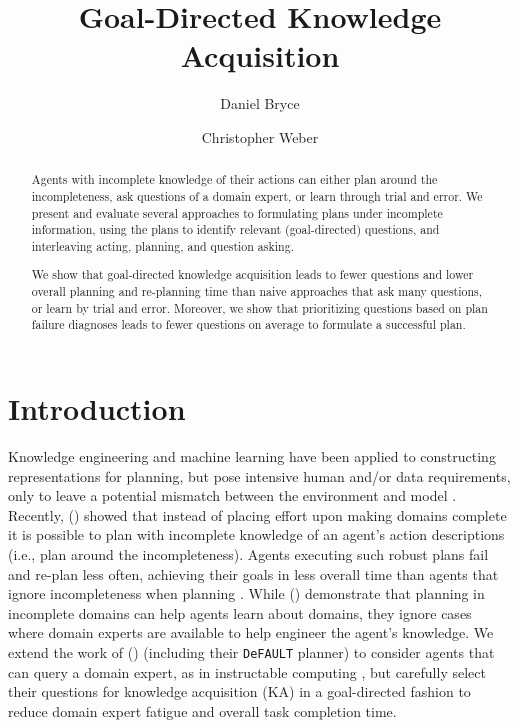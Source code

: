 \documentclass{article}
\title{Goal-Directed Knowledge Acquisition}
\author{Daniel Bryce \and Christopher Weber}
\date{}
\def\citep#1{\cite{#1}}
\def\citet#1{\citeauthor{#1} (\citeyear{#1})}
\def\default{{\tt DeFAULT}}
\begin{document}
\nocopyright
\maketitle

\begin{abstract}
Agents with incomplete knowledge of their actions can either plan around the
incompleteness, ask questions of a domain expert, or learn through trial and
error.  We present and evaluate several approaches to formulating plans under
incomplete information, using the plans to identify relevant (goal-directed)
questions, and interleaving acting, planning, and question asking.  

We show that goal-directed knowledge acquisition leads to fewer questions and
lower overall planning and re-planning time than naive approaches that ask many
questions, or learn by trial and error.  Moreover, we show that prioritizing
questions based on plan failure diagnoses leads to fewer questions on average to
formulate a successful plan.
\end{abstract}

\section{Introduction}

Knowledge engineering \citep{ickeps09} and machine learning
\citep{arms,DBLP:conf/aaai/OatesC96} have been applied to constructing
representations for planning, but pose intensive human and/or data requirements,
only to leave a potential mismatch between the environment and model
\citep{modellite}.  Recently, \citet{bryce-icaps11} showed that instead of
placing effort upon making domains complete it is possible to plan with
incomplete knowledge of an agent's action descriptions (i.e., plan around the
incompleteness).  Agents executing such robust plans fail and re-plan less often,
achieving their goals in less overall time than agents that ignore
incompleteness when planning \citep{DBLP:conf/aips/ChangA06}.  While
\citet{bryce-icaps11} demonstrate that planning in incomplete domains can
help agents learn about domains, they ignore cases where domain experts are
available to help engineer the agent's knowledge.  We extend the work of
\citet{bryce-icaps11} (including their \default{} planner) to consider agents
that can query a domain expert, as in instructable computing \citep{mable}, but carefully select their questions for
knowledge acquisition (KA) in a goal-directed fashion to reduce domain expert
fatigue and overall task completion time.
\end{document}
